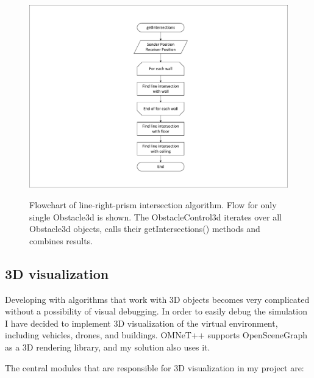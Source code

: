 \documentclass[]{nsm-thesis}
\begin{document}
\begin{figure}
  	\caption{Flowchart of line-right-prism intersection algorithm. Flow for only single Obstacle3d is shown. The ObstacleControl3d iterates over all Obstacle3d objects, calls their getIntersections() methods and combines results.}
	\centering
	\includegraphics[width=1\textwidth]{figures/Obstacle3d-flow.pdf}
	\label{fig:obstacle3d-flow}
\end{figure}

\subsection{3D visualization}

Developing with algorithms that work with 3D objects becomes very complicated without a possibility of visual debugging. In order to easily debug the simulation I have decided to implement 3D visualization of the virtual environment, including vehicles, drones, and buildings. OMNeT++ supports OpenSceneGraph as a 3D rendering library, and my solution also uses it. 

The central modules that are responsible for 3D visualization in my project are: 
\end{document}
